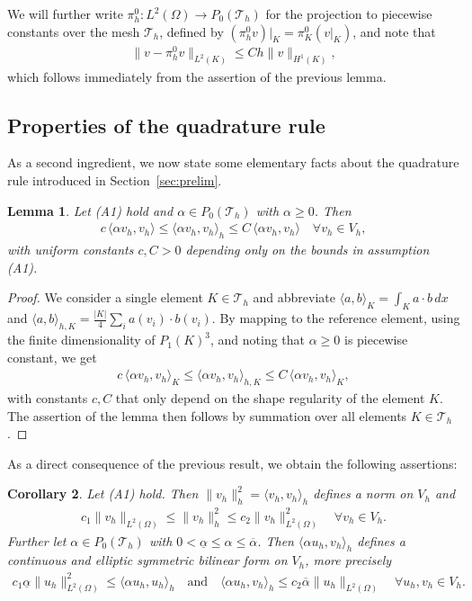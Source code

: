 \documentclass[12pt,reqno,a4paper]{amsart}
\newtheorem{lemma}{Lemma}[section]
\newtheorem{corollary}[lemma]{Corollary}
\theoremstyle{definition}
\def\Th{\mathcal{T}_h}
\def\K{K}
\def\Th{\mathcal{T}_h}
\def\la{\langle}
\def\ra{\rangle}
\begin{document}
We will further write $\pi^0_h : L^2(\Omega) \to P_0(\Th)$ for the projection to piecewise constants over the mesh $\Th$, defined by $(\pi^0_h v)|_K = \pi^0_\K(v|_K)$, and note that 
\begin{align} \label{eq:proj0}
\|v - \pi^0_h v\|_{L^2(K)} \le C h \|v\|_{H^1(K)},
\end{align}
which follows immediately from the assertion of the previous lemma. 


\subsection{Properties of the quadrature rule}

As a second ingredient, we now state some elementary facts about the quadrature rule introduced in Section~\ref{sec:prelim}. 
\begin{lemma} \label{lem:equiv}
Let (A1) hold and $\alpha \in P_0(\Th)$ with $\alpha \ge 0$. Then 
\begin{align}
c\,\la\alpha v_h,v_h\ra \le \la\alpha v_h,v_h\ra_h \le C \, \la\alpha v_h,v_h\ra \quad \forall v_h\in V_h,
\end{align}
with uniform constants $c,C>0$ depending only on the bounds in assumption (A1). 
\end{lemma}
\begin{proof}
We consider a single element $K \in \Th$ and abbreviate $\la a,b\ra_K=\int_K a \cdot b \, dx$ and $\la a,b\ra_{h,K} = \frac{|K|}{4} \sum_i a(v_i) \cdot b(v_i)$. By mapping to the reference element, using the finite dimensionality of $P_1(K)^3$, and noting that $\alpha \ge 0$ is piecewise constant, we get 
\begin{align*}
c \, \la\alpha v_h,v_h\ra_K \le \la\alpha v_h,v_h\ra_{h,K} \le C \, \la\alpha v_h,v_h\ra_K,
\end{align*}
with constants $c,C$ that only depend on the shape regularity of the element $K$. 
The assertion of the lemma then follows by summation over all elements $K \in \Th$.
\end{proof}
As a direct consequence of the previous result, we obtain the following assertions:
\begin{corollary} \label{cor:equiv}
Let (A1) hold.
Then $\|v_h\|_h^2=\la v_h,v_h\ra_h$ defines a norm on $V_h$ and
\begin{align}
c_1 \|v_h\|_{L^2(\Omega)} \le \|v_h\|_h^2 \le c_2 \|v_h\|_{L^2(\Omega)}^2 \quad \forall v_h \in V_h.
\end{align}
Further let $\alpha \in P_0(\Th)$ with $0 < \underline \alpha \le \alpha \le \overline \alpha$. 
Then $\la\alpha u_h,v_h\ra_h$ defines a continuous and elliptic symmetric bilinear form on $V_h$, more precisely
\begin{align*}
c_1 \underline \alpha \|u_h\|_{L^2(\Omega)}^2 \le \la\alpha u_h,u_h\ra_h \quad \text{and} \quad 
\la\alpha u_h,v_h\ra_h \le c_2 \overline \alpha \|u_h\|_{L^2(\Omega)} \quad \forall u_h,v_h \in V_h.
\end{align*}
\end{corollary}
\end{document}
